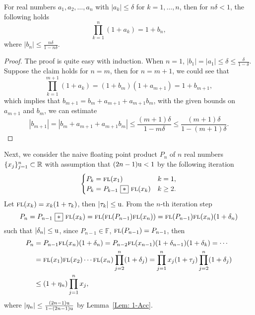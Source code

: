 \begin{lemma}
\label{Lem: 1-Acc}
    For real numbers $a_1, a_2, \dots, a_n$ with $|a_k|\le \delta$ for $k=1,\dots, n$, then for $n\delta < 1$, the following holds
    $$\prod_{k=1}^n (1 + a_k) = 1 + b_n,$$
    where $|b_n| \le \frac{n\delta}{1 - n\delta}$.
\end{lemma}


\begin{proof}
    The proof is quite easy with induction. When $n=1$, $|b_1| = |a_1|\le \delta \le \frac{\delta}{1 - \delta}$. Suppose the claim holds for $n = m$, then for $n = m +1$, we could see that
    \begin{equation*}
        \prod_{k=1}^{m+1} (1 + a_k) = (1 + b_m) (1 + a_{m+1}) = 1 + b_{m+1}, 
    \end{equation*}
    which implies that $b_{m+1} = b_m + a_{m+1} + a_{m+1}b_m$, with the given bounds on $a_{m+1}$ and $b_m$, we can estimate
    \begin{equation*}
        |b_{m+1}| = | b_m + a_{m+1} + a_{m+1}b_m | \le \frac{(m+1)\delta}{1 - m\delta} \le \frac{(m+1)\delta}{1 - (m+1)\delta}.
    \end{equation*}
\end{proof}


Next, we consider the naive floating point product $P_n$ of $n$ real numbers $\{x_j\}_{j=1}^n \subset \mathbb R$ with assumption that $(2n-1)\textup{u} < 1$ by the following iteration
\begin{equation*}
    \begin{cases}
        P_k = {\textsc{fl}}(x_1) & k=1,\\
        P_k = P_{k-1}~\boxed{\ast}~ {\textsc{fl}}(x_k) & k\ge 2.
    \end{cases}
\end{equation*}
Let ${\textsc{fl}}(x_k) = x_k(1 + \tau_k)$, then $|\tau_k|\le \textup{u}$. From the $n$-th iteration step $$P_n = P_{n-1}~\boxed{\ast}~ {\textsc{fl}}(x_k) = {\textsc{fl}}({\textsc{fl}}(P_{n-1}){\textsc{fl}}(x_n)) = {\textsc{fl}}(P_{n-1}){\textsc{fl}}(x_n)(1 + \delta_n)$$ such that $|\delta_n|\le \textup{u}$, since $P_{n-1}\in \mathbb{F}$, ${\textsc{fl}}(P_{n-1}) = P_{n-1}$, then 
\begin{equation*}
    \begin{aligned}
        P_n &= P_{n-1} {\textsc{fl}}(x_n)(1 + \delta_n) = P_{n-2} {\textsc{fl}}(x_{n-1})(1 + \delta_{n-1}) (1 + \delta_k) = \cdots \\
        &=  {\textsc{fl}}(x_1) {\textsc{fl}}(x_2)\cdots {\textsc{fl}}(x_n) \prod_{j=2}^n (1 + \delta_j) = \prod_{j=1}^n x_j (1 + \tau_j)  \prod_{j=2}^n (1 + \delta_j) \\
        &\le  (1 + \eta_n) \prod_{j=1}^n x_j,
    \end{aligned}
\end{equation*}
where $|\eta_n|\le \frac{(2n-1)\textup{u}}{1 - (2n-1)\textup{u}}$ by Lemma~\ref{Lem: 1-Acc}. 

